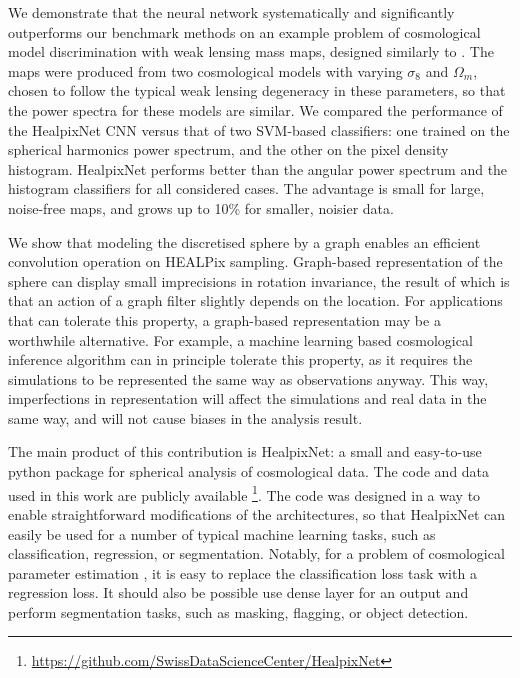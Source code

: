 \documentclass[final,twocolumn,3p,times,sort&compress]{elsarticle}
\newcommand{\1}{\b{1}}              %
\newcommand{\0}{\b{0}}              %
\begin{document}
We demonstrate that the neural network systematically and significantly outperforms our benchmark methods on an example problem of cosmological model discrimination with weak lensing mass maps, designed similarly to \citep{schmelze2017cosmologicalmodel}.
The maps were produced from two cosmological models with varying $\sigma_8$ and $\Omega_m$, chosen to follow the typical weak lensing degeneracy in these parameters, so that the power spectra for these models are similar.
We compared the performance of the HealpixNet CNN versus that of two SVM-based classifiers: one trained on the spherical harmonics power spectrum, and the other on the pixel density histogram.
HealpixNet performs better than the angular power spectrum and the histogram classifiers for all considered cases.
The advantage is small for large, noise-free maps, and grows up to 10\% for smaller, noisier data.

We show that modeling the discretised sphere by a graph enables an efficient convolution operation on HEALPix sampling.
Graph-based representation of the sphere can display small imprecisions in rotation invariance, the result of which is that an action of a graph filter slightly depends on the location.
For applications that can tolerate this property, a graph-based representation may be a worthwhile alternative.
For example, a machine learning based cosmological inference algorithm can in principle tolerate this property, as it requires the simulations to be represented the same way as observations anyway.
This way, imperfections in representation will affect the simulations and real data in the same way, and will not cause biases in the analysis result.

The main product of this contribution is HealpixNet: a small and easy-to-use python package for spherical analysis of cosmological data.
The code and data used in this work are publicly available{ \footnote{\url{https://github.com/SwissDataScienceCenter/HealpixNet}}}.
The code was designed in a way to enable straightforward modifications of the architectures, so that HealpixNet can easily be used for a number of typical machine learning tasks, such as classification, regression, or segmentation.
Notably, for a problem of cosmological parameter estimation \citep{fluri2018deep,gupta2018nongaussianinformation}, it is easy to replace the classification loss task with a regression loss.
It should also be possible use dense layer for an output and perform segmentation tasks, such as masking, flagging, or object detection.
\end{document}
